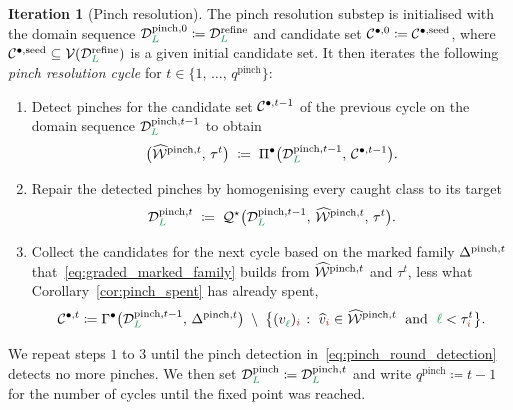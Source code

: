 \documentclass[a4paper, 12pt]{article}
\makeatletter
\newcommand{\quadriV}{\mathcal{Q}^{\star}}                       %
\newcommand{\detectV}{\Pi^{\bullet}}                             %
\newcommand{\collectV}{\Gamma^{\bullet}}                         %
\DeclareRobustCommand{\candV}[1][]{\mathcal{C}^{\bullet\ifx\@empty#1\@empty\else,#1\fi}}
\newcommand{\quadriVup}[1]{\quadriV_{\rightarrow #1}}            %
\newcommand{\targetlevel}{\tau}                                 %
\newcommand{\green}{\color{ForestGreen}}
\newcommand{\brickred}{\color{BrickRed}}
\newcommand{\V}{\mathcal{V}}
\DeclareRobustCommand{\simplexsubsetTwo}[2][]{\Delta\ifx\@empty#1\@empty\else^{#1}\fi_{#2}}
\newcommand{\vertex}[2]{\freeQ{v}{}{#1}{#2}}
\newcommand{\vertexClass}[1]{\widehat{v}_{#1}}
\DeclareRobustCommand{\markedVertexClasses}[1][]{\widehat{\mathcal{W}}\ifx\@empty#1\@empty\else^{#1}\fi}
\newcommand{\coarseIdxone}{{\brickred i}}
\renewcommand{\l}{{\green\ell}}
\renewcommand{\L}{{\green L}}
\newcommand{\freeQ}[4]{ ( {#1}^{#2}_{#3} )_{#4}}
\theoremstyle{definition}
\newtheorem{iteration}[theorem]{Iteration}
\theoremstyle{plain}
\numberwithin{equation}{section}
\newcommand{\tobecut}[1]{{\color{red} #1}}     %
\DeclareRobustCommand{\domseq}[1][]{\mathcal{D}\ifx\@empty#1\@empty\else_{#1}\fi}
\makeatother
\begin{document}
\begin{iteration}[Pinch resolution]
\label{it:pinch_iteration}
    The pinch resolution substep is initialised with the domain sequence $\domseq[\L]^{\mathrm{pinch},0} \coloneq \domseq[\L]^{\mathrm{refine}}$ and candidate set $\candV[0] \coloneq \candV[\mathrm{seed}]$, where $\candV[\mathrm{seed}] \subseteq \V(\domseq[\L]^{\mathrm{refine}})$ is a given initial candidate set. It then iterates the following \emph{pinch resolution cycle} for $t \in \{1, \, \ldots, \, q^{\mathrm{pinch}} \}$:
    \begin{enumerate}[topsep=3pt, itemsep=-2pt]
    \item Detect pinches for the candidate set $\candV[t-1]$ of the previous cycle on the domain sequence $\domseq[\L]^{\mathrm{pinch},t-1}$ to obtain
    \begin{equation}
        \label{eq:pinch_round_detection}
        \big( \markedVertexClasses[\mathrm{pinch},t], \, \targetlevel^t \big) \; \coloneq \; \detectV \big( \domseq[\L]^{\mathrm{pinch},t-1}, \, \candV[t-1] \big).
    \end{equation}
    \vspace{-7mm}
    \item Repair the detected pinches by homogenising every caught class to its target
    \begin{equation}
        \label{eq:pinch_round_repair}
        \domseq[\L]^{\mathrm{pinch},t} \; \coloneq \; \quadriV \big( \domseq[\L]^{\mathrm{pinch},t-1}, \, \markedVertexClasses[\mathrm{pinch},t], \, \targetlevel^t \big).
    \end{equation}
    \vspace{-7mm}
    \item Collect the candidates for the next cycle based on the marked family $\simplexsubsetTwo[\mathrm{pinch},t]{}$ that~\eqref{eq:graded_marked_family} builds from $\markedVertexClasses[\mathrm{pinch},t]$ and $\targetlevel^t$, less what Corollary~\ref{cor:pinch_spent} has already spent,
    \begin{equation}
        \label{eq:pinch_candidates}
        \candV[t] \coloneq \collectV \big( \domseq[\L]^{\mathrm{pinch},t-1}, \, \simplexsubsetTwo[\mathrm{pinch},t]{} \big) \; \setminus \; \big\{ \vertex{\l}{\coarseIdxone} \; \colon \; \vertexClass{\coarseIdxone} \in \markedVertexClasses[\mathrm{pinch},t] \; \text{ and } \; \l < \targetlevel^t_\coarseIdxone \big\}.
    \end{equation}
\end{enumerate}
We repeat steps $1$ to $3$ until the pinch detection in~\eqref{eq:pinch_round_detection} detects no more pinches. We then set $\domseq[\L]^{\mathrm{pinch}} \coloneq \domseq[\L]^{\mathrm{pinch},t}$ and write $q^{\mathrm{pinch}} \coloneq t \! - \! 1$ for the number of cycles until the fixed point was reached.


\end{iteration}
\end{document}
